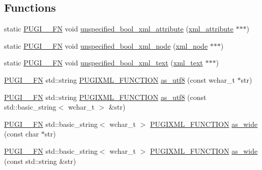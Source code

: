 \subsection*{Functions}
\begin{DoxyCompactItemize}
\item 
static \hyperlink{pugixml_8cpp_a82c335af3ca48cdb209c506bf8dd6ad2}{P\+U\+G\+I\+\_\+\+\_\+\+FN} void \hyperlink{namespacepugi_a8effe3a6fc7cc9c1cf2550739dbdc438}{unspecified\+\_\+bool\+\_\+xml\+\_\+attribute} (\hyperlink{classpugi_1_1xml__attribute}{xml\+\_\+attribute} $\ast$$\ast$$\ast$)
\item 
static \hyperlink{pugixml_8cpp_a82c335af3ca48cdb209c506bf8dd6ad2}{P\+U\+G\+I\+\_\+\+\_\+\+FN} void \hyperlink{namespacepugi_a487b2e720a3808d6fd5730d7c97bcdac}{unspecified\+\_\+bool\+\_\+xml\+\_\+node} (\hyperlink{classpugi_1_1xml__node}{xml\+\_\+node} $\ast$$\ast$$\ast$)
\item 
static \hyperlink{pugixml_8cpp_a82c335af3ca48cdb209c506bf8dd6ad2}{P\+U\+G\+I\+\_\+\+\_\+\+FN} void \hyperlink{namespacepugi_acfae514de3abac05ed155e531a401c15}{unspecified\+\_\+bool\+\_\+xml\+\_\+text} (\hyperlink{classpugi_1_1xml__text}{xml\+\_\+text} $\ast$$\ast$$\ast$)
\item 
\hyperlink{pugixml_8cpp_a82c335af3ca48cdb209c506bf8dd6ad2}{P\+U\+G\+I\+\_\+\+\_\+\+FN} std\+::string \hyperlink{pugixml_8hpp_a3d91f8ab11645e6dac8783d86d152b31}{P\+U\+G\+I\+X\+M\+L\+\_\+\+F\+U\+N\+C\+T\+I\+ON} \hyperlink{namespacepugi_a69383a1ee3e92185f93bb2322472d3ce}{as\+\_\+utf8} (const wchar\+\_\+t $\ast$str)
\item 
\hyperlink{pugixml_8cpp_a82c335af3ca48cdb209c506bf8dd6ad2}{P\+U\+G\+I\+\_\+\+\_\+\+FN} std\+::string \hyperlink{pugixml_8hpp_a3d91f8ab11645e6dac8783d86d152b31}{P\+U\+G\+I\+X\+M\+L\+\_\+\+F\+U\+N\+C\+T\+I\+ON} \hyperlink{namespacepugi_ab4be9ab3dc86b13599b9f2fd2f778dfb}{as\+\_\+utf8} (const std\+::basic\+\_\+string$<$ wchar\+\_\+t $>$ \&str)
\item 
\hyperlink{pugixml_8cpp_a82c335af3ca48cdb209c506bf8dd6ad2}{P\+U\+G\+I\+\_\+\+\_\+\+FN} std\+::basic\+\_\+string$<$ wchar\+\_\+t $>$ \hyperlink{pugixml_8hpp_a3d91f8ab11645e6dac8783d86d152b31}{P\+U\+G\+I\+X\+M\+L\+\_\+\+F\+U\+N\+C\+T\+I\+ON} \hyperlink{namespacepugi_ae372a27a1d2b6a23e431155820fbf166}{as\+\_\+wide} (const char $\ast$str)
\item 
\hyperlink{pugixml_8cpp_a82c335af3ca48cdb209c506bf8dd6ad2}{P\+U\+G\+I\+\_\+\+\_\+\+FN} std\+::basic\+\_\+string$<$ wchar\+\_\+t $>$ \hyperlink{pugixml_8hpp_a3d91f8ab11645e6dac8783d86d152b31}{P\+U\+G\+I\+X\+M\+L\+\_\+\+F\+U\+N\+C\+T\+I\+ON} \hyperlink{namespacepugi_af33046c0db1ff7b3f63327d32fc6dca7}{as\+\_\+wide} (const std\+::string \&str)

\end{DoxyCompactItemize}
